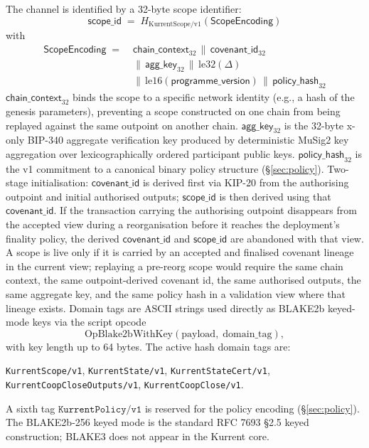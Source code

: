 \documentclass[10pt,a4paper]{article}
\begin{document}
The channel is identified by a 32-byte scope identifier:
\[
  \mathsf{scope\_id} \;=\; H_{\mathrm{KurrentScope/v1}}(\mathsf{ScopeEncoding})
\]
with
\[
  \begin{aligned}
  \mathsf{ScopeEncoding} \;=\;& \mathsf{chain\_context}_{32}
   \,\|\, \mathsf{covenant\_id}_{32} \\
   & \|\, \mathsf{agg\_key}_{32}
   \,\|\, \mathrm{le32}(\Delta) \\
   & \|\, \mathrm{le16}(\mathsf{programme\_version})
   \,\|\, \mathsf{policy\_hash}_{32}
  \end{aligned}
\]
$\mathsf{chain\_context}_{32}$ binds the scope to a specific network identity (e.g., a hash of the genesis parameters), preventing a scope constructed on one chain from being replayed against the same outpoint on another chain. $\mathsf{agg\_key}_{32}$ is the 32-byte x-only BIP-340 aggregate verification key produced by deterministic MuSig2 \cite{musig2} key aggregation over lexicographically ordered participant public keys. $\mathsf{policy\_hash}_{32}$ is the v1 commitment to a canonical binary policy structure (§\ref{sec:policy}). Two-stage initialisation: $\mathsf{covenant\_id}$ is derived first via KIP-20 from the authorising outpoint and initial authorised outputs; $\mathsf{scope\_id}$ is then derived using that $\mathsf{covenant\_id}$. If the transaction carrying the authorising outpoint disappears from the accepted view during a reorganisation before it reaches the deployment's finality policy, the derived $\mathsf{covenant\_id}$ and $\mathsf{scope\_id}$ are abandoned with that view. A scope is live only if it is carried by an accepted and finalised covenant lineage in the current view; replaying a pre-reorg scope would require the same chain context, the same outpoint-derived covenant id, the same authorised outputs, the same aggregate key, and the same policy hash in a validation view where that lineage exists. Domain tags are ASCII strings used directly as BLAKE2b keyed-mode keys via the script opcode
\[
  \mathrm{OpBlake2bWithKey}(\mathrm{payload},\; \mathrm{domain\_tag}),
\]
with key length up to 64 bytes. The active hash domain tags are:
\begin{center}
\small
\texttt{KurrentScope/v1}, \texttt{KurrentState/v1}, \texttt{KurrentStateCert/v1},\\
\texttt{KurrentCoopCloseOutputs/v1}, \texttt{KurrentCoopClose/v1}.
\end{center}
A sixth tag $\texttt{KurrentPolicy/v1}$ is reserved for the policy encoding (§\ref{sec:policy}). The BLAKE2b-256 keyed mode is the standard RFC 7693 §2.5 keyed construction; BLAKE3 does not appear in the Kurrent core.
\end{document}
